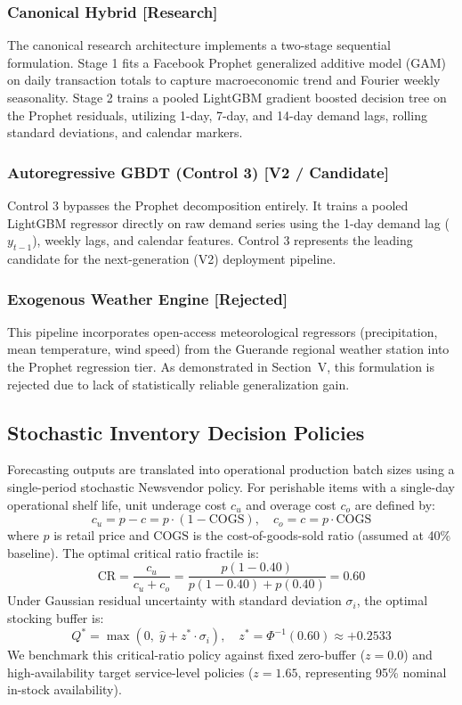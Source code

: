 \documentclass[conference]{IEEEtran}
\begin{document}
\subsubsection{Canonical Hybrid [Research]}
The canonical research architecture implements a two-stage sequential formulation. Stage 1 fits a Facebook Prophet generalized additive model (GAM) on daily transaction totals to capture macroeconomic trend and Fourier weekly seasonality. Stage 2 trains a pooled LightGBM gradient boosted decision tree on the Prophet residuals, utilizing 1-day, 7-day, and 14-day demand lags, rolling standard deviations, and calendar markers.

\subsubsection{Autoregressive GBDT (Control 3) [V2 / Candidate]}
Control 3 bypasses the Prophet decomposition entirely. It trains a pooled LightGBM regressor directly on raw demand series using the 1-day demand lag ($y_{t-1}$), weekly lags, and calendar features. Control 3 represents the leading candidate for the next-generation (V2) deployment pipeline.

\subsubsection{Exogenous Weather Engine [Rejected]}
This pipeline incorporates open-access meteorological regressors (precipitation, mean temperature, wind speed) from the Guerande regional weather station into the Prophet regression tier. As demonstrated in Section~V, this formulation is rejected due to lack of statistically reliable generalization gain.

\subsection{Stochastic Inventory Decision Policies}
Forecasting outputs are translated into operational production batch sizes using a single-period stochastic Newsvendor policy. For perishable items with a single-day operational shelf life, unit underage cost $c_u$ and overage cost $c_o$ are defined by:
\begin{equation}
c_u = p - c = p \cdot (1 - \text{COGS}), \quad c_o = c = p \cdot \text{COGS}
\end{equation}
where $p$ is retail price and $\text{COGS}$ is the cost-of-goods-sold ratio (assumed at 40\% baseline). The optimal critical ratio fractile is:
\begin{equation}
\text{CR} = \frac{c_u}{c_u + c_o} = \frac{p(1 - 0.40)}{p(1 - 0.40) + p(0.40)} = 0.60
\end{equation}
Under Gaussian residual uncertainty with standard deviation $\sigma_i$, the optimal stocking buffer is:
\begin{equation}
Q^* = \max\left(0, \;\hat{y} + z^* \cdot \sigma_i\right), \quad z^* = \Phi^{-1}(0.60) \approx +0.2533
\end{equation}
We benchmark this critical-ratio policy against fixed zero-buffer ($z=0.0$) and high-availability target service-level policies ($z=1.65$, representing 95\% nominal in-stock availability).
\end{document}
